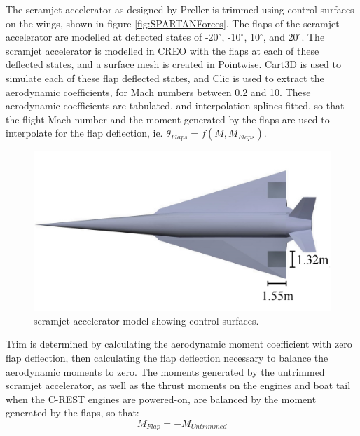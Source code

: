 		The scramjet accelerator as designed by Preller\cite{Preller2017b} is trimmed using control surfaces on the wings, shown in figure \ref{fig:SPARTANForces}. 
		The flaps of the scramjet accelerator are modelled at deflected states of -20$^\circ$, -10$^\circ$, 10$^\circ$, and 20$^\circ$. The scramjet accelerator is modelled in CREO with the flaps at each of these deflected states, and a surface mesh is created in Pointwise. 
		Cart3D is used to simulate each of these flap deflected states, and Clic is used to extract the aerodynamic coefficients, for Mach numbers between 0.2 and 10. These aerodynamic coefficients are tabulated, and interpolation splines fitted, so that the flight Mach number and the moment generated by the flaps are used to interpolate for the flap deflection, ie. $\theta_{Flaps} = f(M,M_{Flaps})$.
		\begin{figure}[ht]
			\centering
			\includegraphics[width=0.6\linewidth]{figures/3_vehicle_design/SPARTAN_FLAPS}
			\caption{scramjet accelerator model showing control surfaces.}
			\label{fig:SPARTAN_FLAPS}
		\end{figure}
		Trim is determined by calculating the aerodynamic moment coefficient with zero flap deflection, then calculating the flap deflection necessary to balance the aerodynamic moments to zero. The moments generated by the untrimmed scramjet accelerator, as well as the thrust moments on the engines and boat tail when the C-REST engines are powered-on, are balanced by the moment generated by the flaps, so that:
		\begin{equation}
		M_{Flap} = -M_{Untrimmed}
		\end{equation}
		  
		
		 
		 
		

		
		
